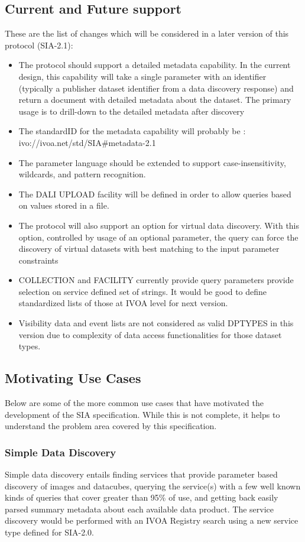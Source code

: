 \documentclass[11pt,a4paper]{ivoa}
\begin{document}
\subsection{Current and Future support}
 These are the list of changes which  will be considered in a later version of this protocol  (SIA-2.1):
\begin{itemize}
    \item The protocol should support  a detailed {metadata} capability. In the current design, this   capability will take a single parameter with an identifier (typically a publisher dataset identifier from a data discovery response) and return a document with detailed metadata about the dataset. The primary usage is to drill-down to the detailed  metadata after discovery
    \item The standardID for the {metadata} capability will  probably be : ivo://ivoa.net/std/SIA\#metadata-2.1
    \item  The parameter language should be extended to support case-insensitivity, wildcards, and pattern recognition.
    \item The DALI UPLOAD facility will be defined in order to allow queries based on values stored in a file.
    \item The protocol will also support an option for virtual data discovery. With this option, controlled by usage of an optional parameter, the  query can force the discovery of virtual datasets with best  matching to the input parameter constraints
    \item COLLECTION and FACILITY currently provide query parameters provide selection on service defined set of strings. It would be good to define standardized lists of those at IVOA level for next version.
    \item Visibility data and event lists are not considered as valid DPTYPES in this version due to complexity of data access functionalities for those dataset types.
\end{itemize}

\subsection{Motivating Use Cases}
Below are some of the more common use cases that have motivated the development of the SIA specification. While this is not complete, it helps to understand the problem area covered by this specification.
\subsubsection{Simple Data Discovery}
Simple data discovery entails finding services that provide parameter based discovery of images and datacubes, querying the service(s) with a few well known kinds of queries that cover greater than 95\% of use, and getting back easily parsed summary metadata about each available data product. The service discovery would be performed with an IVOA Registry search using a new service type defined for SIA-2.0.
\end{document}
